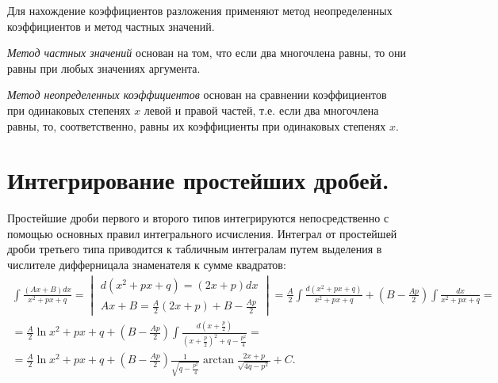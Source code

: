 \documentclass[11pt]{article}
\begin{document}
	Для нахождение коэффициентов разложения применяют метод неопределенных коэффициентов и метод частных значений.

	\textit{Метод частных значений} основан на том, что если два многочлена равны, то они равны при любых значениях аргумента.

	\textit{Метод неопределенных коэффициентов} основан на сравнении коэффициентов при одинаковых степенях $x$ левой и правой частей, т.е. если два многочлена равны, то, соответственно, равны их коэффициенты при одинаковых степенях $x$.
	\section{Интегрирование простейших дробей.}
	Простейшие дроби первого и второго типов интегрируются непосредственно с помощью основных правил интегрального исчисления.
	Интеграл от простейшей дроби третьего типа приводится к табличным интегралам путем выделения в числителе дифферницала знаменателя к сумме квадратов:
	\begin{align*}
		\int{\frac{(Ax+B)dx}{x^2 + px + q}} = 
		\begin{vmatrix}
			d(x^2 + px + q) = (2x + p)dx\\
			Ax + B = \frac{A}{2}(2x + p) + B - \frac{Ap}{2}
		\end{vmatrix}
		= \frac{A}{2} \int{\frac{d(x^2 + px + q)}{x^2 + px + q}} + \left(B - \frac{Ap}{2}\right)\int{\frac{dx}{x^2 + px + q}} = \\
		= \frac{A}{2}\ln{x^2 + px + q} + \left(B - \frac{Ap}{2}\right)\int{\frac{d\left(x + \frac{p}{2}\right)}{(x + \frac{p}{2})^2 + q - \frac{p^2}{4}}} =\\
		= \frac{A}{2}\ln{x^2 + px + q} + \left(B - \frac{Ap}{2}\right)\frac{1}{\sqrt{q - \frac{p^2}{4}}}\arctan\frac{2x + p}{\sqrt{4q - p^2}} + C.
	\end{align*}
\end{document}
